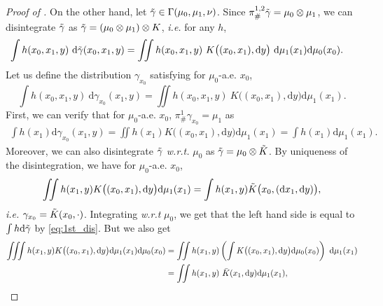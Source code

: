 \documentclass[twoside]{article}
\begin{document}
\begin{proof}[Proof of ]
    On the other hand, let $\Tilde{\gamma}\in\Gamma(\mu_0,\mu_1,\nu)$. Since $\pi^{1,2}_\#\Tilde{\gamma}=\mu_0\otimes \mu_1$, we can disintegrate $\Tilde{\gamma}$ as $\Tilde{\gamma}=(\mu_0\otimes \mu_1)\otimes K$, \emph{i.e.} for any $h$,
    \begin{equation} \label{eq:1st_dis}
        \begin{aligned}
            \int h(x_0,x_1,y)\ \mathrm{d}\Tilde{\gamma}(x_0,x_1,y) &= \iint h(x_0,x_1,y)\  K\big((x_0,x_1), \mathrm{d}y\big)\ \mathrm{d}\mu_1(x_1)\mathrm{d}\mu_0(x_0).
        \end{aligned}
    \end{equation}
    Let us define the distribution $\gamma_{x_0}$ satisfying for $\mu_0$-a.e. $x_0$,
    \begin{equation}
        \int h(x_0,x_1,y)\ \mathrm{d}\gamma_{x_0}(x_1,y) = \iint h(x_0,x_1,y)\ K\big((x_0,x_1), \mathrm{d}y\big)\mathrm{d}\mu_1(x_1).
    \end{equation}
    First, we can verify that for $\mu_0$-a.e. $x_0$, $\pi^1_\#\gamma_{x_0}=\mu_1$ as
    \begin{equation}
        \begin{aligned}
            \int h(x_1) \mathrm{d}\gamma_{x_0}(x_1,y) = \iint h(x_1) K\big((x_0,x_1), \mathrm{d}y\big)\mathrm{d}\mu_1(x_1) = \int h(x_1)\mathrm{d}\mu_1(x_1).
        \end{aligned}
    \end{equation}
    Moreover, we can also disintegrate $\Tilde{\gamma}$ \emph{w.r.t.} $\mu_0$ as $\Tilde{\gamma}=\mu_0\otimes \Tilde{K}$. By uniqueness of the disintegration, we have for $\mu_0$-a.e. $x_0$,
    \begin{equation} \label{eq:equality_dis}
        \iint h(x_1, y) K\big((x_0,x_1), \mathrm{d}y\big)\mathrm{d}\mu_1(x_1) = \int h(x_1, y) \Tilde{K}\big(x_0, (\mathrm{d}x_1,\mathrm{d}y)\big),
    \end{equation}
    \emph{i.e.} $\gamma_{x_0} = \Tilde{K}(x_0,\cdot)$.
    Integrating \emph{w.r.t} $\mu_0$, we get that the left hand side is equal to $\int h\mathrm{d}\Tilde{\gamma}$ by \eqref{eq:1st_dis}. But we also get
    \begin{equation}
        \begin{aligned}
            \iiint h(x_1,y) K\big((x_0,x_1), \mathrm{d}y\big)\mathrm{d}\mu_1(x_1)\mathrm{d}\mu_0(x_0) &= \iint h(x_1,y) \left(\int K\big((x_0,x_1), \mathrm{d}y\big)\mathrm{d}\mu_0(x_0) \right)\ \mathrm{d}\mu_1(x_1) \\
            &= \iint h(x_1,y)\ \Bar{K}(x_1,\mathrm{d}y)\mathrm{d}\mu_1(x_1),

\end{aligned}
\end{equation}
\end{proof}
\end{document}
